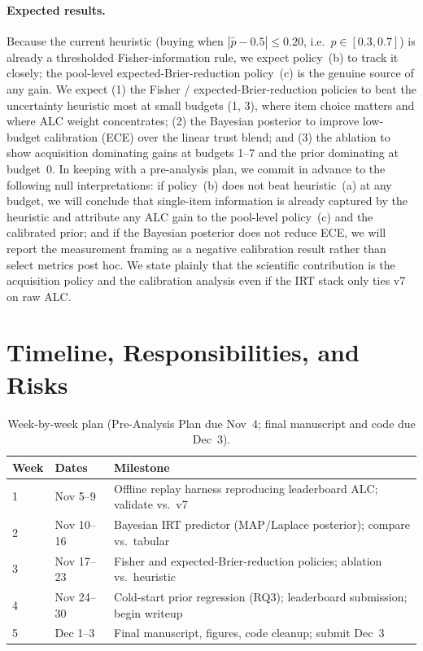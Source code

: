 \documentclass{article}
\begin{document}
\paragraph{Expected results.} Because the current heuristic (buying when
$|\hat p - 0.5|\le 0.20$, i.e.\ $p\in[0.3,0.7]$) is already a thresholded
Fisher-information rule, we expect policy~(b) to track it closely; the pool-level
expected-Brier-reduction policy~(c) is the genuine source of any gain. We expect
(1) the Fisher / expected-Brier-reduction policies to beat the uncertainty
heuristic most at small budgets (1, 3), where item choice matters and where ALC
weight concentrates; (2) the Bayesian posterior to improve low-budget calibration
(ECE) over the linear trust blend; and (3) the ablation to show acquisition
dominating gains at budgets 1--7 and the prior dominating at budget~0.
In keeping with a pre-analysis plan, we commit in advance to the following null
interpretations: if policy~(b) does not beat heuristic~(a) at any budget, we will
conclude that single-item information is already captured by the heuristic and
attribute any ALC gain to the pool-level policy~(c) and the calibrated prior; and
if the Bayesian posterior does not reduce ECE, we will report the measurement
framing as a negative calibration result rather than select metrics post hoc. We
state plainly that the scientific contribution is the acquisition policy and the
calibration analysis even if the IRT stack only ties v7 on raw ALC.

\section{Timeline, Responsibilities, and Risks}

\begin{table}[h]
  \centering
  \caption{Week-by-week plan (Pre-Analysis Plan due Nov~4; final manuscript and
  code due Dec~3).}
  \label{tab:timeline}
  \begin{tabular}{lll}
    \toprule
    Week & Dates & Milestone \\
    \midrule
    1 & Nov 5--9   & Offline replay harness reproducing leaderboard ALC; validate vs.\ v7 \\
    2 & Nov 10--16 & Bayesian IRT predictor (MAP/Laplace posterior); compare vs.\ tabular \\
    3 & Nov 17--23 & Fisher and expected-Brier-reduction policies; ablation vs.\ heuristic \\
    4 & Nov 24--30 & Cold-start prior regression (RQ3); leaderboard submission; begin writeup \\
    5 & Dec 1--3   & Final manuscript, figures, code cleanup; submit Dec~3 \\
    \bottomrule
  \end{tabular}
\end{table}
\end{document}
